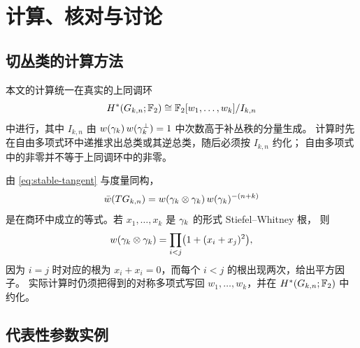 \section{计算、核对与讨论}

\subsection{切丛类的计算方法}

本文的计算统一在真实的上同调环
\begin{equation*}
  H^{*}(G_{k,n};\mathbb{F}_2)\cong\mathbb{F}_2[w_1,\dots,w_k]/I_{k,n}
\end{equation*}
中进行，其中 $I_{k,n}$ 由 $w(\gamma_k)\,w(\gamma^{\perp}_k)=1$ 中次数高于补丛秩的分量生成。
计算时先在自由多项式环中递推求出总类或其逆总类，随后必须按 $I_{k,n}$ 约化；
自由多项式中的非零并不等于上同调环中的非零。

由 \eqref{eq:stable-tangent} 与度量同构，
\begin{equation*}
  \bar w(TG_{k,n})=w(\gamma_k\otimes\gamma_k)\,w(\gamma_k)^{-(n+k)}
\end{equation*}
是在商环中成立的等式。若 $x_1,\dots,x_k$ 是 $\gamma_k$ 的形式 Stiefel--Whitney 根，
则
\begin{equation*}
  w(\gamma_k\otimes\gamma_k)=\prod_{i<j}\bigl(1+(x_i+x_j)^{2}\bigr),
\end{equation*}
因为 $i=j$ 时对应的根为 $x_i+x_i=0$，而每个 $i<j$ 的根出现两次，给出平方因子。
实际计算时仍须把得到的对称多项式写回 $w_1,\dots,w_k$，并在
$H^{*}(G_{k,n};\mathbb{F}_2)$ 中约化。

\subsection{代表性参数实例}

